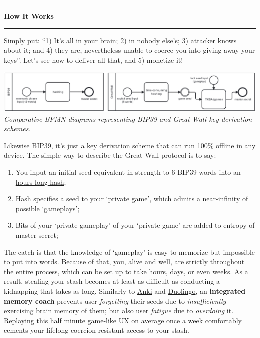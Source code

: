 \documentclass[8pt]{article}
\begin{document}

{\color{accent}\hrule}
\vspace{0.2cm}
{\Large\textbf{How It Works}}
\vspace{0.2cm}
{\color{accent}\hrule}
\vspace{0.3cm}

\noindent
Simply put: ``1) It's all in your brain; 2) in nobody else's; 3) attacker knows about it; and 4) they are, nevertheless unable to coerce you into giving away your keys''. Let's see how to deliver all that, and 5) monetize it!

\begin{center}
    \includegraphics[width=1\textwidth]{gw-one-pager-diagram.png}
    \textit{Comparative BPMN diagrams representing BIP39 and Great Wall key derivation schemes.}
\end{center}


\noindent
Likewise BIP39, it's just a key derivation scheme that can run 100\% offline in any device. The simple way to describe the Great Wall protocol is to say:

\begin{enumerate}
 \item You input an initial seed equivalent in strength to 6 BIP39 words into an \href{https://tr.ee/AakqlgRNiZ}{hours-long hash};
 \item Hash specifies a seed to your `private game', which admits a near-infinity of possible `gameplays';
 \item Bits of your `private gameplay' of your `private game' are added to entropy of master secret;
\end{enumerate}

\noindent
The catch is that the knowledge of `gameplay' is easy to memorize but impossible to put into words.
Because of that, you, alive and well, are strictly throughout the entire process, \href{https://tr.ee/AakqlgRNiZ}{which can be set up to take hours, days, or even weeks}.
As a result, stealing your stash becomes at least as difficult as conducting a kidnapping that takes as long. %
Similarly to \href{https://apps.ankiweb.net/}{Anki} and \href{https://www.duolingo.com/}{Duolingo}, an \textbf{integrated memory coach} prevents user \textit{forgetting} their seeds due to \textit{insufficiently} exercising brain memory of them; but also user \textit{fatigue} due to \textit{overdoing} it. Replaying this half minute game-like UX on average once a week comfortably cements your lifelong coercion-resistant access to your stash.
\end{document}
